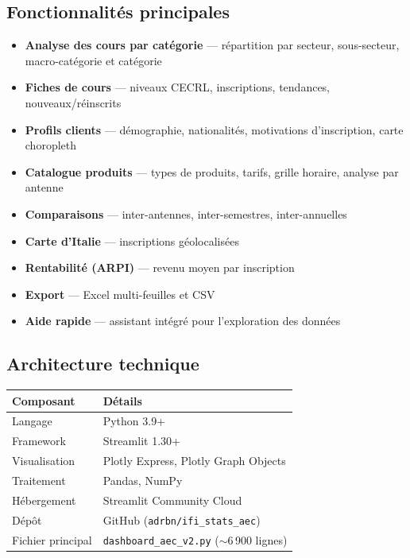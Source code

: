 \documentclass[12pt,a4paper,twoside]{article}
\begin{document}
\subsection{Fonctionnalit\'{e}s principales}

\begin{itemize}[leftmargin=2em]
  \item \textbf{Analyse des cours par cat\'{e}gorie} --- r\'{e}partition par secteur, sous-secteur, macro-cat\'{e}gorie et cat\'{e}gorie
  \item \textbf{Fiches de cours} --- niveaux CECRL, inscriptions, tendances, nouveaux/r\'{e}inscrits
  \item \textbf{Profils clients} --- d\'{e}mographie, nationalit\'{e}s, motivations d'inscription, carte choropleth
  \item \textbf{Catalogue produits} --- types de produits, tarifs, grille horaire, analyse par antenne
  \item \textbf{Comparaisons} --- inter-antennes, inter-semestres, inter-annuelles
  \item \textbf{Carte d'Italie} --- inscriptions g\'{e}olocalis\'{e}es
  \item \textbf{Rentabilit\'{e} (ARPI)} --- revenu moyen par inscription
  \item \textbf{Export} --- Excel multi-feuilles et CSV
  \item \textbf{Aide rapide} --- assistant int\'{e}gr\'{e} pour l'exploration des donn\'{e}es
\end{itemize}

\subsection{Architecture technique}

\begin{center}
\begin{tabularx}{\textwidth}{lX}
\toprule
\textbf{Composant} & \textbf{D\'{e}tails} \\
\midrule
Langage & Python 3.9+ \\
Framework & Streamlit 1.30+ \\
Visualisation & Plotly Express, Plotly Graph Objects \\
Traitement & Pandas, NumPy \\
H\'{e}bergement & Streamlit Community Cloud \\
D\'{e}p\^{o}t & GitHub (\texttt{adrbn/ifi\_stats\_aec}) \\
Fichier principal & \texttt{dashboard\_aec\_v2.py} ($\sim$6\,900 lignes) \\
\bottomrule
\end{tabularx}
\end{center}
\end{document}
